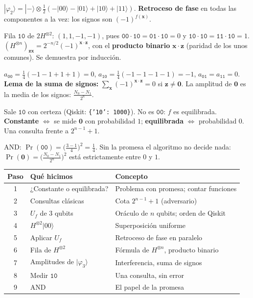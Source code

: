 \documentclass[11pt, a4paper, twoside, openright]{report}
\newcommand{\pasoguiado}[3]{%
\begin{tcolorbox}[colback=gray!6!white,colframe=gray!55!black,title={#1}]
#2
\tcblower
\small #3
\end{tcolorbox}}
\providecommand{\ket}[1]{|#1\rangle}
\newcommand{\bx}{\mathbf{x}}
\newcommand{\bz}{\mathbf{z}}
\newcommand{\bcero}{\mathbf{0}}
\begin{document}
\pasoguiado{Paso 5. Una consulta}
{$\ket{\varphi_2} = \ket{-}\otimes\tfrac12(-\ket{00}-\ket{01}+\ket{10}+\ket{11})$.}
{\textbf{Retroceso de fase} en todas las componentes a la vez: los signos son $(-1)^{f(\bx)}$.}

\pasoguiado{Paso 6. La fórmula de $H^{\otimes n}$}
{Fila $\texttt{10}$ de $2H^{\otimes2}$: $(1, 1, -1, -1)$, pues $\texttt{00}\cdot\texttt{10} = \texttt{01}\cdot\texttt{10} = 0$ y $\texttt{10}\cdot\texttt{10} = \texttt{11}\cdot\texttt{10} = 1$.}
{$(H^{\otimes n})_{\bz\bx} = 2^{-n/2}(-1)^{\bx\cdot\bz}$, con el \textbf{producto binario} $\bx\cdot\bz$ (paridad de los unos comunes). Se demuestra por inducción.}

\pasoguiado{Paso 7. Interferencia}
{$a_{\texttt{00}} = \tfrac14(-1-1+1+1) = 0$, \quad $a_{\texttt{10}} = \tfrac14(-1-1-1-1) = -1$, \quad $a_{\texttt{01}} = a_{\texttt{11}} = 0$.}
{\textbf{Lema de la suma de signos:} $\sum_{\bx}(-1)^{\bx\cdot\bz} = 0$ si $\bz\neq\bcero$. La amplitud de $\bcero$ es la media de los signos: $\frac{N_0 - N_1}{2^n}$.}

\pasoguiado{Paso 8. Medir}
{Sale $\texttt{10}$ con certeza (Qiskit: \texttt{\{'10': 1000\}}). No es $\texttt{00}$: $f$ es equilibrada.}
{\textbf{Constante} $\iff$ se mide $\bcero$ con probabilidad $1$; \textbf{equilibrada} $\iff$ probabilidad $0$. Una consulta frente a $2^{n-1}+1$.}

\pasoguiado{Paso 9. Si incumplen la promesa}
{AND: $\Pr(\texttt{00}) = \big(\tfrac{3-1}{4}\big)^2 = \tfrac14$.}
{Sin la promesa el algoritmo no decide nada: $\Pr(\bcero) = \big(\frac{N_0-N_1}{2^n}\big)^2$ está estrictamente entre $0$ y $1$.}

\begin{center}
\small\renewcommand{\arraystretch}{1.15}
\begin{tabular}{c|l|l}
\textbf{Paso} & \textbf{Qué hicimos} & \textbf{Concepto} \\ \hline
1 & ¿Constante o equilibrada? & Problema con promesa; contar funciones \\
2 & Consultas clásicas & Cota $2^{n-1}+1$ (adversario) \\
3 & $U_f$ de 3 qubits & Oráculo de $n$ qubits; orden de Qiskit \\
4 & $H^{\otimes2}\ket{00}$ & Superposición uniforme \\
5 & Aplicar $U_f$ & Retroceso de fase en paralelo \\
6 & Fila de $H^{\otimes2}$ & Fórmula de $H^{\otimes n}$, producto binario \\
7 & Amplitudes de $\ket{\varphi_3}$ & Interferencia, suma de signos \\
8 & Medir $\texttt{10}$ & Una consulta, sin error \\
9 & AND & El papel de la promesa
\end{tabular}
\end{center}
\end{document}
